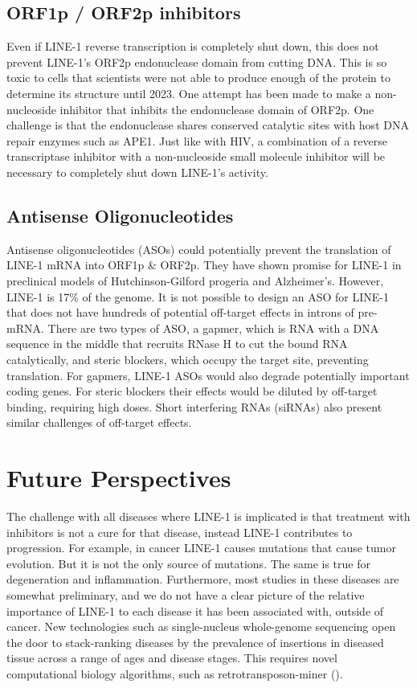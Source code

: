 \documentclass[11pt,twocolumn,twoside]{extarticle}
\begin{document}
\subsection{ORF1p / ORF2p inhibitors}
Even if LINE-1 reverse transcription is completely shut down, this does not prevent LINE-1's ORF2p endonuclease domain from cutting DNA. This is so toxic to cells that scientists were not able to produce enough of the protein to determine its structure until 2023\cite{baldwin,leslie,thawani}. One attempt has been made to make a non-nucleoside inhibitor that inhibits the endonuclease domain of ORF2p\cite{dordine}. One challenge is that the endonuclease shares conserved catalytic sites with host DNA repair enzymes such as APE1. Just like with HIV, a combination of a reverse transcriptase inhibitor with a non-nucleoside small molecule inhibitor will be necessary to completely shut down LINE-1's activity.

\subsection{Antisense Oligonucleotides}
Antisense oligonucleotides (ASOs) could potentially prevent the translation of LINE-1 mRNA into ORF1p \& ORF2p. They have shown promise for LINE-1 in preclinical models of Hutchinson-Gilford progeria\cite{dellavalle} and Alzheimer's\cite{herdy}. However, LINE-1 is 17\% of the genome. It is not possible to design an ASO for LINE-1 that does not have hundreds of potential off-target effects in introns of pre-mRNA. There are two types of ASO, a gapmer, which is RNA with a DNA sequence in the middle that recruits RNase H to cut the bound RNA catalytically, and steric blockers, which occupy the target site, preventing translation. For gapmers, LINE-1 ASOs would also degrade potentially important coding genes. For steric blockers their effects would be diluted by off-target binding, requiring high doses. Short interfering RNAs (siRNAs) also present similar challenges of off-target effects.

\section{Future Perspectives}
The challenge with all diseases where LINE-1 is implicated is that treatment with inhibitors is not a cure for that disease, instead LINE-1 contributes to progression. For example, in cancer LINE-1 causes mutations that cause tumor evolution. But it is not the only source of mutations. The same is true for degeneration and inflammation. Furthermore, most studies in these diseases are somewhat preliminary, and we do not have a clear picture of the relative importance of LINE-1 to each disease it has been associated with, outside of cancer. New technologies such as single-nucleus whole-genome sequencing open the door to stack-ranking diseases by the prevalence of insertions in diseased tissue across a range of ages and disease stages. This requires novel computational biology algorithms, such as retrotransposon-miner (\href{https://github.com/L1-Therapeutics/retrotransposon-miner}{\faGithub}).
\end{document}
